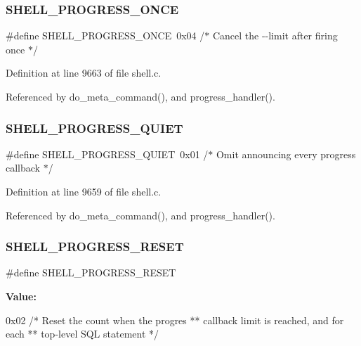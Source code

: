 \subsubsection{S\+H\+E\+L\+L\+\_\+\+P\+R\+O\+G\+R\+E\+S\+S\+\_\+\+O\+N\+CE}
{\footnotesize\ttfamily \#define S\+H\+E\+L\+L\+\_\+\+P\+R\+O\+G\+R\+E\+S\+S\+\_\+\+O\+N\+CE~0x04  /$\ast$ Cancel the -\/-\/limit after firing once $\ast$/}



Definition at line 9663 of file shell.\+c.



Referenced by do\+\_\+meta\+\_\+command(), and progress\+\_\+handler().

\mbox{\label{shell_8c_a45dd80658588b5a4618592a8836ead31}} 
\subsubsection{S\+H\+E\+L\+L\+\_\+\+P\+R\+O\+G\+R\+E\+S\+S\+\_\+\+Q\+U\+I\+ET}
{\footnotesize\ttfamily \#define S\+H\+E\+L\+L\+\_\+\+P\+R\+O\+G\+R\+E\+S\+S\+\_\+\+Q\+U\+I\+ET~0x01  /$\ast$ Omit announcing every progress callback $\ast$/}



Definition at line 9659 of file shell.\+c.



Referenced by do\+\_\+meta\+\_\+command(), and progress\+\_\+handler().

\mbox{\label{shell_8c_ad31d2fdfaf952ae6f286cd04a1c274df}} 
\subsubsection{S\+H\+E\+L\+L\+\_\+\+P\+R\+O\+G\+R\+E\+S\+S\+\_\+\+R\+E\+S\+ET}
{\footnotesize\ttfamily \#define S\+H\+E\+L\+L\+\_\+\+P\+R\+O\+G\+R\+E\+S\+S\+\_\+\+R\+E\+S\+ET}

{\bfseries Value\+:}
\begin{DoxyCode}
0x02  \textcolor{comment}{/* Reset the count when the progres}
\textcolor{comment}{                                   ** callback limit is reached, and for each}
\textcolor{comment}{                                   ** top-level SQL statement */}
\end{DoxyCode}


